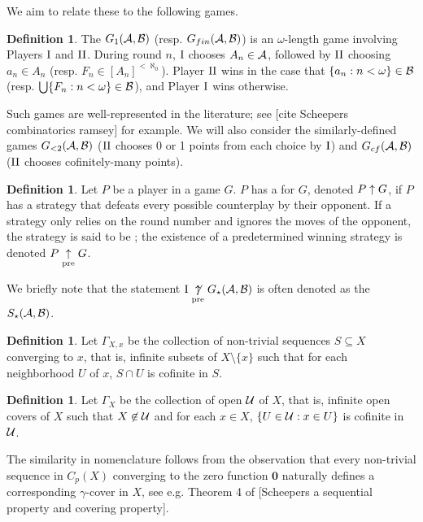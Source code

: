 \documentclass{amsart}
\renewcommand{\vec}{\mathbf}
\theoremstyle{plain}
\theoremstyle{definition}
\newtheorem{definition}[theorem]{Definition}
\theoremstyle{remark}
\theoremstyle{plain}
\theoremstyle{definition}
\theoremstyle{remark}
\begin{document}
We aim to relate these to the following games.

\begin{definition}
  The  \(G_1(\mathcal{A},\mathcal{B})\) (resp. \(G_{fin}(\mathcal{A},\mathcal{B})\))
  is an \(\omega\)-length game involving Players \(\mathrm{I}\) and \(\mathrm{II}\). 
  During round \(n\), \(\mathrm{I}\) chooses
  \(A_n\in\mathcal{A}\), followed by \(\mathrm{II}\) choosing \(a_n\in A_n\)
  (resp. \(F_n\in[A_n]^{<\aleph_0}\)).
  Player \(\mathrm{II}\) wins in the case that \(\{a_n:n<\omega\}\in\mathcal{B}\)
  (resp. \(\bigcup\{F_n:n<\omega\}\in\mathcal{B}\)),
  and Player \(\mathrm{I}\) wins otherwise.
\end{definition}

Such games are well-represented in the literature; see [cite Scheepers combinatorics ramsey]
for example.
We will also consider the similarly-defined games \(G_{<2}(\mathcal{A},\mathcal{B})\)
(\(\mathrm{II}\) chooses 0 or 1 points from each choice by \(\mathrm{I}\)) and \(G_{cf}(\mathcal{A},\mathcal{B})\)
(\(\mathrm{II}\) chooses cofinitely-many points).

\begin{definition}
  Let \(P\) be a player in a game \(G\). \(P\) has a 
  for \(G\), denoted \(P\uparrow G\), if \(P\) has a strategy that defeats every
  possible counterplay by their opponent. If a strategy only relies on the
  round number and ignores the moves of the opponent, the strategy is said
  to be ; the existence of a predetermined winning strategy
  is denoted \(P\underset{\text{pre}}{\uparrow} G\).
\end{definition}

We briefly note that the statement \(\mathrm{I}\underset{\text{pre}}{\not\uparrow} G_\star(\mathcal{A},\mathcal{B})\)
is often denoted as the  \(S_\star(\mathcal{A},\mathcal{B})\).

\begin{definition}
Let \(\Gamma_{X,x}\) be the collection of non-trivial sequences \(S\subseteq X\) converging to \(x\),
that is, infinite subsets of \(X\setminus\{x\}\) such that for each neighborhood \(U\) of \(x\),
\(S\cap U\) is cofinite in \(S\).
\end{definition}

\begin{definition}
Let \(\Gamma_X\) be the collection of open  \(\mathcal{U}\) of \(X\),
that is, infinite open covers of \(X\) such that \(X\not\in \mathcal{U}\) and for each \(x\in X\),
\(\{U\in\mathcal{U}:x\in U\}\) is cofinite in \(\mathcal{U}\).
\end{definition}

The similarity in nomenclature follows from the observation that every non-trivial sequence in
\(C_p(X)\) converging to the zero function \(\vec{0}\) naturally defines a corresponding
\(\gamma\)-cover in \(X\), see e.g. Theorem 4 of
[Scheepers a sequential property and covering property].
\end{document}
